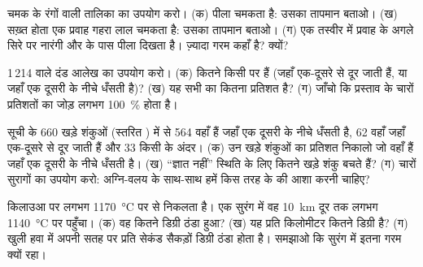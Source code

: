 \begin{exercise}[$\star$]\label{exo:g7:volcanoes:4}
चमक के रंगों वाली तालिका का उपयोग करो। (क)  पीला चमकता है: उसका तापमान
बताओ। (ख) सख़्त होता एक प्रवाह गहरा लाल चमकता है: उसका तापमान बताओ।
(ग) एक तस्वीर में प्रवाह के अगले सिरे पर नारंगी  और  के पास पीला
 दिखता है। ज़्यादा गरम कहाँ है? क्यों?
\end{exercise}

\begin{exercise}[$\star\star$]\label{exo:g7:volcanoes:5}
1\,214  वाले दंड आलेख का उपयोग करो। (क) कितने  किसी
 पर हैं (जहाँ  एक-दूसरे से दूर जाती हैं, या जहाँ एक दूसरी के
नीचे धँसती है)? (ख) यह सभी  का कितना प्रतिशत है? (ग) जाँचो कि
प्रस्ताव के चारों प्रतिशतों का जोड़ लगभग 100~\% होता है।
\end{exercise}

\begin{exercise}[$\star\star$]\label{exo:g7:volcanoes:6}
सूची के 660 खड़े शंकुओं (स्तरित ) में से 564 वहाँ हैं जहाँ एक 
दूसरी के नीचे धँसती है, 62 वहाँ जहाँ  एक-दूसरे से दूर जाती हैं और 33 किसी
 के अंदर। (क) उन खड़े शंकुओं का प्रतिशत निकालो जो वहाँ हैं जहाँ एक 
दूसरी के नीचे धँसती है। (ख) ``ज्ञात नहीं'' स्थिति के लिए कितने खड़े शंकु बचते
हैं? (ग) चारों सुरागों का उपयोग करो: अग्नि-वलय के साथ-साथ हमें किस तरह के
 की आशा करनी चाहिए?
\end{exercise}

\begin{exercise}[$\star\star$]\label{exo:g7:volcanoes:7}
किलाउआ पर  लगभग \qty{1170}{\degreeCelsius} पर  से निकलता है।
एक  सुरंग में वह \qty{10}{km} दूर  तक लगभग
\qty{1140}{\degreeCelsius} पर पहुँचा। (क) वह कितने डिग्री ठंडा हुआ? (ख) यह
प्रति किलोमीटर कितने डिग्री है? (ग) खुली हवा में  अपनी सतह पर प्रति सेकंड
सैकड़ों डिग्री ठंडा होता है। समझाओ कि सुरंग में  इतना गरम क्यों
रहा।
\end{exercise}

